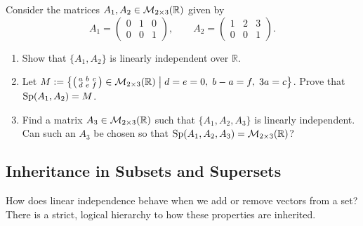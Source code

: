 \begin{exercise}
\label{exc:matrix_span_and_independence}
Consider the matrices $A_1, A_2 \in \mathcal{M}_{2 \times 3}(\mathbb{R})$ given by
\[
A_1 = \begin{pmatrix} 0 & 1 & 0 \\ 0 & 0 & 1 \end{pmatrix}, \qquad A_2 = \begin{pmatrix} 1 & 2 & 3 \\ 0 & 0 & 1 \end{pmatrix}.
\]
\begin{enumerate}
    \item Show that $\{A_1, A_2\}$ is linearly independent over $\mathbb{R}$.
    \item Let $M := \left\{ \left(\begin{smallmatrix} a & b & c \\ d & e & f \end{smallmatrix}\right) \in \mathcal{M}_{2 \times 3}(\mathbb{R}) \;\middle|\; d = e = 0, \; b - a = f, \; 3a = c \right\}$. Prove that $\operatorname{Sp}(A_1, A_2) = M$.
    \item Find a matrix $A_3 \in \mathcal{M}_{2 \times 3}(\mathbb{R})$ such that $\{A_1, A_2, A_3\}$ is linearly independent. Can such an $A_3$ be chosen so that $\operatorname{Sp}(A_1, A_2, A_3) = \mathcal{M}_{2 \times 3}(\mathbb{R})$?
\end{enumerate}
\end{exercise}

\subsection{Inheritance in Subsets and Supersets}

How does linear independence behave when we add or remove vectors from a set? There is a strict, logical hierarchy to how these properties are inherited. 

